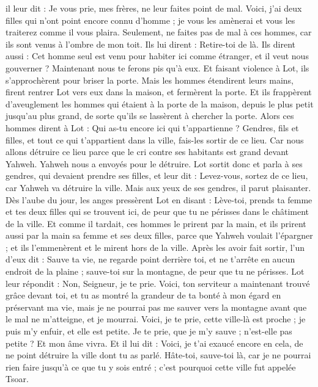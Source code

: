\begin{multicols}{2}
il leur dit : Je vous prie, mes frères, ne leur faites point de mal.
Voici, j'ai deux filles qui n'ont point encore connu d'homme ; je vous les amènerai et vous les traiterez comme il vous plaira. Seulement, ne faites pas de mal à ces hommes, car ils sont venus à l'ombre de mon toit.
Ils lui dirent : Retire-toi de là. Ils dirent aussi : Cet homme seul est venu pour habiter ici comme étranger, et il veut nous gouverner ? Maintenant nous te ferons pis qu'à eux. Et faisant violence à Lot,  ils s'approchèrent pour briser la porte.
Mais les hommes étendirent leurs mains, firent rentrer Lot vers eux dans la maison, et fermèrent la porte.
Et ils frappèrent d’aveuglement les hommes qui étaient à la porte de la maison, depuis le plus petit jusqu'au plus grand, de sorte qu'ils se lassèrent à chercher la porte.
Alors ces hommes dirent à Lot : Qui as-tu encore ici qui t'appartienne ? Gendres, fils et filles, et tout ce qui t'appartient dans la ville, fais-les sortir de ce lieu.
Car nous allons détruire ce lieu parce que le cri contre ses habitants est grand devant Yahweh. Yahweh nous a envoyés pour le détruire.
Lot sortit donc et parla à ses gendres, qui devaient prendre ses filles, et leur dit : Levez-vous, sortez de ce lieu, car Yahweh va détruire la ville. Mais aux yeux de ses gendres, il parut plaisanter.
Dès l’aube du jour, les anges pressèrent Lot en disant : Lève-toi, prends ta femme et tes deux filles qui se trouvent ici, de peur que tu ne périsses dans le châtiment de la ville.
Et comme il tardait, ces hommes le prirent par la main, et ils prirent aussi par la main sa femme et ses deux filles, parce que Yahweh voulait l'épargner ; et ils l'emmenèrent et le mirent hors de la ville.
Après les avoir fait sortir, l'un d’eux dit : Sauve ta vie, ne regarde point derrière toi, et ne t'arrête en aucun endroit de la plaine ; sauve-toi sur la montagne, de peur que tu ne périsses.
Lot leur répondit : Non, Seigneur, je te prie.
Voici, ton serviteur a maintenant trouvé grâce devant toi, et tu as montré la grandeur de ta bonté à mon égard en préservant ma vie, mais je ne pourrai pas me sauver vers la montagne avant que le mal ne m'atteigne, et je mourrai.
Voici, je te prie, cette ville-là est proche ; je puis m'y enfuir, et elle est petite. Je te prie, que je m'y sauve ; n'est-elle pas petite ? Et mon âme vivra.
Et il lui dit : Voici, je t'ai exaucé encore en cela, de ne point détruire la ville dont tu as parlé.
Hâte-toi, sauve-toi là, car je ne pourrai rien faire jusqu'à ce que tu y sois entré ; c'est pourquoi cette ville fut appelée Tsoar.

\end{multicols}
